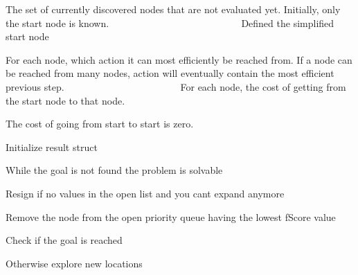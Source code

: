 The set of currently discovered nodes that are not evaluated yet. Initially, only the start node is known. ~\newline
~\newline
~\newline
~\newline
~\newline
~\newline
~\newline
~\newline
~\newline
~\newline
~\newline
~\newline
~\newline
~\newline
~\newline
~\newline
 Defined the simplified start node

For each node, which action it can most efficiently be reached from. If a node can be reached from many nodes, action will eventually contain the most efficient previous step. ~\newline
~\newline
~\newline
~\newline
~\newline
~\newline
~\newline
~\newline
~\newline
~\newline
~\newline
~\newline
~\newline
~\newline
 For each node, the cost of getting from the start node to that node.

The cost of going from start to start is zero.

Initialize result struct

While the goal is not found the problem is solvable

Resign if no values in the open list and you can\textquotesingle{}t expand anymore

Remove the node from the open priority queue having the lowest f\+Score value

Check if the goal is reached

Otherwise explore new locations


